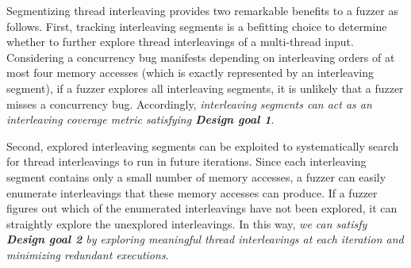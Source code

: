 



%
Segmentizing thread interleaving provides two remarkable benefits to a
fuzzer as follows.
%
First, tracking interleaving segments is a befitting choice to
determine whether to further explore thread interleavings of a
multi-thread input.
%
%
Considering a concurrency bug manifests depending on interleaving
orders of at most four memory accesses (which is exactly represented
by an interleaving segment), if a fuzzer explores all interleaving
segments, it is unlikely that a fuzzer misses a concurrency bug.
%
Accordingly, \textit{interleaving segments can act as an
  interleaving coverage metric satisfying \textbf{Design goal 1}}.







Second, explored interleaving segments can be exploited to
systematically search for thread interleavings to run in future
iterations.
%
Since each interleaving segment contains only a small number of memory
accesses, a fuzzer can easily enumerate interleavings that these
memory accesses can produce.
%
If a fuzzer figures out which of the enumerated interleavings have not
been explored, it can straightly explore the unexplored interleavings.
%
In this way, \textit{we can satisfy \textbf{Design goal 2} by
  exploring meaningful thread interleavings at each iteration and
  minimizing redundant executions}.


